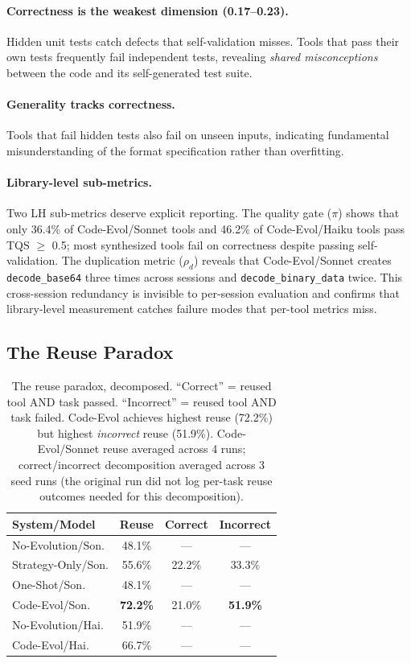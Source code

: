 \documentclass[sigplan,review,anonymous]{acmart}
\begin{document}
\paragraph{Correctness is the weakest dimension (0.17--0.23).} Hidden unit tests catch defects that self-validation misses. Tools that pass their own tests frequently fail independent tests, revealing \emph{shared misconceptions} between the code and its self-generated test suite.

\paragraph{Generality tracks correctness.} Tools that fail hidden tests also fail on unseen inputs, indicating fundamental misunderstanding of the format specification rather than overfitting.

\paragraph{Library-level sub-metrics.} Two LH sub-metrics deserve explicit reporting. The quality gate ($\pi$) shows that only 36.4\% of Code-Evol/Sonnet tools and 46.2\% of Code-Evol/Haiku tools pass TQS $\geq$ 0.5; most synthesized tools fail on correctness despite passing self-validation. The duplication metric ($\rho_d$) reveals that Code-Evol/Sonnet creates \texttt{decode\_base64} three times across sessions and \texttt{decode\_binary\_data} twice. This cross-session redundancy is invisible to per-session evaluation and confirms that library-level measurement catches failure modes that per-tool metrics miss.

\subsection{The Reuse Paradox}
\label{sec:reuse_analysis}

\begin{table}[t]
\centering
\footnotesize
\begin{tabular}{lccc}
\toprule
\textbf{System/Model} & \textbf{Reuse} & \textbf{Correct} & \textbf{Incorrect} \\
\midrule
No-Evolution/Son. & 48.1\% & --- & --- \\
Strategy-Only/Son. & 55.6\% & 22.2\% & 33.3\% \\
One-Shot/Son. & 48.1\% & --- & --- \\
Code-Evol/Son. & \textbf{72.2\%} & 21.0\% & \textbf{51.9\%} \\
\midrule
No-Evolution/Hai. & 51.9\% & --- & --- \\
Code-Evol/Hai. & 66.7\% & --- & --- \\
\bottomrule
\end{tabular}
\caption{The reuse paradox, decomposed. ``Correct'' = reused tool AND task passed. ``Incorrect'' = reused tool AND task failed. Code-Evol achieves highest reuse (72.2\%) but highest \emph{incorrect} reuse (51.9\%). Code-Evol/Sonnet reuse averaged across 4 runs; correct/incorrect decomposition averaged across 3 seed runs (the original run did not log per-task reuse outcomes needed for this decomposition).}
\label{tab:reuse}
\end{table}
\end{document}
